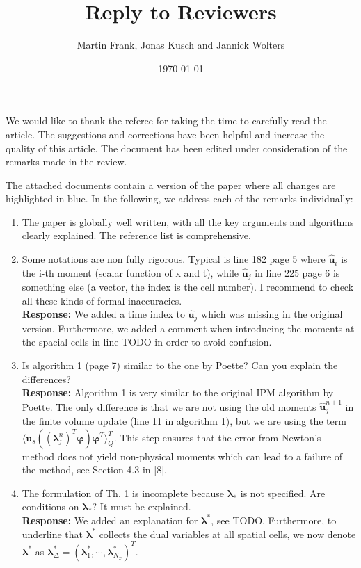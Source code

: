 \documentclass[11pt]{amsart}
\title{Reply to Reviewers}
\author{Martin Frank, Jonas Kusch and Jannick Wolters}
\date{\today}                                           %
\begin{document}
\maketitle

We would like to thank the referee for taking the time to carefully read the article. The suggestions and corrections have been helpful and increase the quality of this article. The document has been edited under consideration of the remarks made in the review.

\vspace{1em}

The attached documents contain a version of the paper where all changes are highlighted in blue. In the following, we address each of the remarks individually:

\begin{enumerate}
\item The paper is globally well written, with all the key arguments and algorithms clearly explained. The reference list is comprehensive.
\item Some notations are non fully rigorous. Typical is line 182 page 5 where $\bm{\hat u}_i$
is the i-th moment (scalar function of x and t), while $\bm{\hat u}_j$ in line 225 page
6 is something else (a vector, the index is the cell number). I recommend
to check all these kinds of formal inaccuracies.
\\ \textbf{Response:} We added a time index to $\bm{\hat u}_j$ which was missing in the original version. Furthermore, we added a comment when introducing the moments at the spacial cells in line TODO in order to avoid confusion.
\item Is algorithm 1 (page 7) similar to the one by Poette? Can you explain the differences?
\\ \textbf{Response:} Algorithm 1 is very similar to the original IPM algorithm by Poette. The only difference is that we are not using the old moments $\bm{\hat u}_j^{n+1}$ in the finite volume update (line 11 in algorithm 1), but we are using the term $\langle \bm u_{s}((\bm{\lambda}_j^n)^T\bm{\varphi})\bm{\varphi}^T\rangle_Q^T$. This step ensures that the error from Newton's method does not yield non-physical moments which can lead to a failure of the method, see Section 4.3 in [8].
\item The formulation of Th. 1 is incomplete because $\bm\lambda_*$ is not specified. Are
conditions on $\bm\lambda_*$? It must be explained.
\\ \textbf{Response:} We added an explanation for $\bm\lambda^*$, see TODO. Furthermore, to underline that $\bm\lambda^*$ collects the dual variables at all spatial cells, we now denote $\bm\lambda^*$ as $\bm{\lambda}_{\Delta}^*=(\bm{\lambda}_{1}^*,\cdots,\bm{\lambda}_{N_x}^*)^T$.

\end{enumerate}
\end{document}
